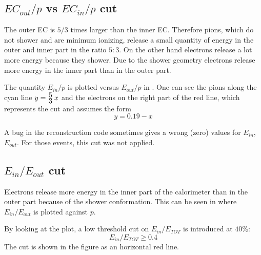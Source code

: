 \subsection{  $EC_{out}/p$ vs $EC_{in}/p$ cut}
The outer EC is $5/3$ times larger than the inner EC. Therefore pions, 
which do not shower and are minimum ionizing,  
release a small quantity of energy in the outer and inner part in the ratio $5:3$.
On the other hand 
electrons release a lot more energy because they shower. 
Due to the shower geometry electrons
release more energy in the inner part than in the outer part.

The quantity $E_{in}/p$ is plotted versus $E_{out}/p$ in .
One can see the pions along the cyan line $y=\frac{\displaystyle 5}{\displaystyle 3}\,x$ and the electrons
on the right part of the red line, which represents the cut and assumes the form
$$
 y = 0.19 - x
$$

A bug in the reconstruction code sometimes gives a wrong (zero) values for $E_{in}$, $E_{out}$. For
those events, this cut was not applied.

\subsection{ $E_{in} / E_{out}$ cut}
Electrons
release more energy in the inner part of the calorimeter than in the outer part because
of the shower conformation. This can be seen in  where $E_{in} / E_{out}$ is
plotted against $p$. 

By looking at the plot, a low threshold cut on $E_{in} / E_{TOT}$ is introduced at $40\%$:
$$
 E_{in} / E_{TOT} \ge 0.4
$$
The cut is shown in the figure as an horizontal red line.



